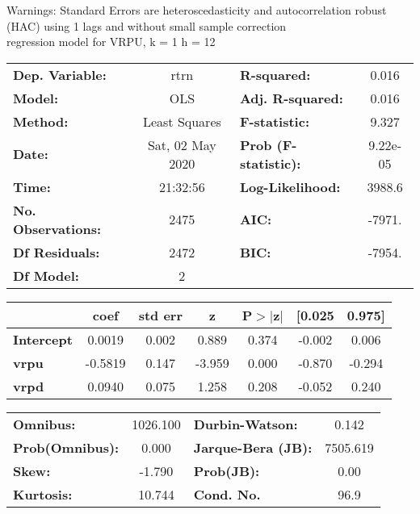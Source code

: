 Warnings: \newline
 [1] Standard Errors are heteroscedasticity and autocorrelation robust (HAC) using 1 lags and without small sample correction\\ 

regression model for VRPU, k = 1 h = 12\begin{center}
\begin{tabular}{lclc}
\toprule
\textbf{Dep. Variable:}    &       rtrn       & \textbf{  R-squared:         } &     0.016   \\
\textbf{Model:}            &       OLS        & \textbf{  Adj. R-squared:    } &     0.016   \\
\textbf{Method:}           &  Least Squares   & \textbf{  F-statistic:       } &     9.327   \\
\textbf{Date:}             & Sat, 02 May 2020 & \textbf{  Prob (F-statistic):} &  9.22e-05   \\
\textbf{Time:}             &     21:32:56     & \textbf{  Log-Likelihood:    } &    3988.6   \\
\textbf{No. Observations:} &        2475      & \textbf{  AIC:               } &    -7971.   \\
\textbf{Df Residuals:}     &        2472      & \textbf{  BIC:               } &    -7954.   \\
\textbf{Df Model:}         &           2      & \textbf{                     } &             \\
\bottomrule
\end{tabular}
\begin{tabular}{lcccccc}
                   & \textbf{coef} & \textbf{std err} & \textbf{z} & \textbf{P$> |$z$|$} & \textbf{[0.025} & \textbf{0.975]}  \\
\midrule
\textbf{Intercept} &       0.0019  &        0.002     &     0.889  &         0.374        &       -0.002    &        0.006     \\
\textbf{vrpu}      &      -0.5819  &        0.147     &    -3.959  &         0.000        &       -0.870    &       -0.294     \\
\textbf{vrpd}      &       0.0940  &        0.075     &     1.258  &         0.208        &       -0.052    &        0.240     \\
\bottomrule
\end{tabular}
\begin{tabular}{lclc}
\textbf{Omnibus:}       & 1026.100 & \textbf{  Durbin-Watson:     } &    0.142  \\
\textbf{Prob(Omnibus):} &   0.000  & \textbf{  Jarque-Bera (JB):  } & 7505.619  \\
\textbf{Skew:}          &  -1.790  & \textbf{  Prob(JB):          } &     0.00  \\
\textbf{Kurtosis:}      &  10.744  & \textbf{  Cond. No.          } &     96.9  \\
\bottomrule
\end{tabular}
\end{center}

